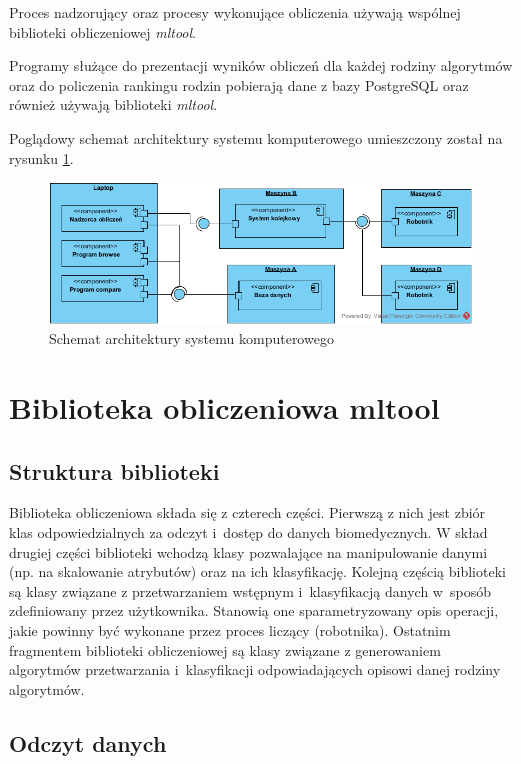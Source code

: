 \documentclass[../thesis.tex]{subfiles}
\begin{document}
Proces nadzorujący oraz procesy wykonujące obliczenia używają wspólnej biblioteki obliczeniowej \emph{mltool}. 

Programy służące do prezentacji wyników obliczeń dla każdej rodziny algorytmów oraz do policzenia rankingu rodzin pobierają dane z bazy PostgreSQL oraz również używają biblioteki \emph{mltool}.

Poglądowy schemat architektury systemu komputerowego umieszczony został na rysunku \ref{proj:arch_diagram}.

\begin{figure}[h]
\centering
\includegraphics[width=\textwidth]{arch.png}
\caption{Schemat architektury systemu komputerowego}
\label{proj:arch_diagram}
\end{figure}

\section{Biblioteka obliczeniowa mltool}

\subsection{Struktura biblioteki}
\label{proj:sec_structure}

Biblioteka obliczeniowa składa się z czterech części. Pierwszą z nich jest zbiór klas odpowiedzialnych za odczyt i~dostęp do danych biomedycznych. W skład drugiej części biblioteki wchodzą klasy pozwalające na manipulowanie danymi (np. na skalowanie atrybutów) oraz na ich klasyfikację. Kolejną częścią biblioteki są klasy związane z przetwarzaniem wstępnym i~klasyfikacją danych w~sposób zdefiniowany przez użytkownika. Stanowią one sparametryzowany opis operacji, jakie powinny być wykonane przez proces liczący (robotnika). Ostatnim fragmentem biblioteki obliczeniowej są klasy związane z generowaniem algorytmów przetwarzania i~klasyfikacji odpowiadających opisowi danej rodziny algorytmów.

\subsection{Odczyt danych}
\end{document}
